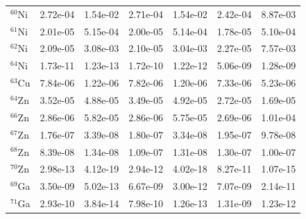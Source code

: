 \begin{table}
\begin{tabular}{l|cc|cc|cc}
$^{60}$Ni & 2.72e-04 & 1.54e-02 & 2.71e-04 & 1.54e-02 & 2.42e-04 & 8.87e-03\\
$^{61}$Ni & 2.01e-05 & 5.15e-04 & 2.00e-05 & 5.14e-04 & 1.78e-05 & 5.10e-04\\
$^{62}$Ni & 2.09e-05 & 3.08e-03 & 2.10e-05 & 3.04e-03 & 2.27e-05 & 7.57e-03\\
$^{64}$Ni & 1.73e-11 & 1.23e-13 & 1.72e-10 & 1.22e-12 & 5.06e-09 & 1.28e-09\\
$^{63}$Cu & 7.84e-06 & 1.22e-06 & 7.82e-06 & 1.20e-06 & 7.33e-06 & 5.23e-06\\
$^{64}$Zn & 3.52e-05 & 4.88e-05 & 3.49e-05 & 4.92e-05 & 2.72e-05 & 1.69e-05\\
$^{66}$Zn & 2.86e-06 & 5.82e-05 & 2.86e-06 & 5.75e-05 & 2.69e-06 & 1.01e-04\\
$^{67}$Zn & 1.76e-07 & 3.39e-08 & 1.80e-07 & 3.34e-08 & 1.95e-07 & 9.78e-08\\
$^{68}$Zn & 8.39e-08 & 1.34e-08 & 1.09e-07 & 1.31e-08 & 1.30e-07 & 1.00e-07\\
$^{70}$Zn & 2.98e-13 & 4.12e-19 & 2.94e-12 & 4.02e-18 & 8.27e-11 & 1.07e-15\\
$^{69}$Ga & 3.50e-09 & 5.02e-13 & 6.67e-09 & 3.00e-12 & 7.07e-09 & 2.14e-11\\
$^{71}$Ga & 2.93e-10 & 3.84e-14 & 7.98e-10 & 1.26e-13 & 1.31e-09 & 1.23e-12\\
\hline
\end{tabular}
\end{table}
\newpage



